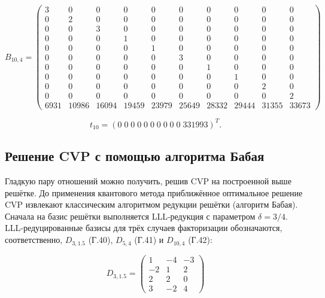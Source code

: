 \begin{equation}
B_{10,4}=
\begin{pmatrix}
 3    & 0    & 0    & 0    & 0    & 0    & 0    & 0    & 0    & 0    \\
 0    & 2    & 0    & 0    & 0    & 0    & 0    & 0    & 0    & 0    \\
 0    & 0    & 3    & 0    & 0    & 0    & 0    & 0    & 0    & 0    \\
 0    & 0    & 0    & 1    & 0    & 0    & 0    & 0    & 0    & 0    \\
 0    & 0    & 0    & 0    & 1    & 0    & 0    & 0    & 0    & 0    \\
 0    & 0    & 0    & 0    & 0    & 3    & 0    & 0    & 0    & 0    \\
 0    & 0    & 0    & 0    & 0    & 0    & 1    & 0    & 0    & 0    \\
 0    & 0    & 0    & 0    & 0    & 0    & 0    & 1    & 0    & 0    \\
 0    & 0    & 0    & 0    & 0    & 0    & 0    & 0    & 2    & 0    \\
 0    & 0    & 0    & 0    & 0    & 0    & 0    & 0    & 0    & 2    \\
 6931 & 10986& 16094& 19459& 23979& 25649& 28332& 29444& 31355& 33673
\end{pmatrix}
\end{equation}

\begin{equation}
t_{10} = (0\; 0\; 0\; 0\; 0\; 0\; 0\; 0\; 0\; 0\; 331993)^{T}.
\end{equation}

\subsection*{Решение CVP с помощью алгоритма Бабая}

Гладкую пару отношений можно получить, решив CVP на построенной выше решётке.
До применения квантового метода приближённое оптимальное решение CVP извлекают
классическим алгоритмом редукции решётки (алгоритм Бабая). Сначала на базис
решётки выполняется LLL‑редукция с параметром \(\delta=3/4\).
LLL‑редуцированные базисы для трёх случаев факторизации обозначаются,
соответственно, \(D_{3,1.5}\) (Г.40), \(D_{5,4}\) (Г.41) и \(D_{10,4}\) (Г.42):

\begin{equation}
D_{3,1.5} =
\begin{pmatrix}
 1 & -4 & -3 \\
-2 &  1 &  2 \\
 2 &  2 &  0 \\
 3 & -2 &  4
\end{pmatrix}
\end{equation}

